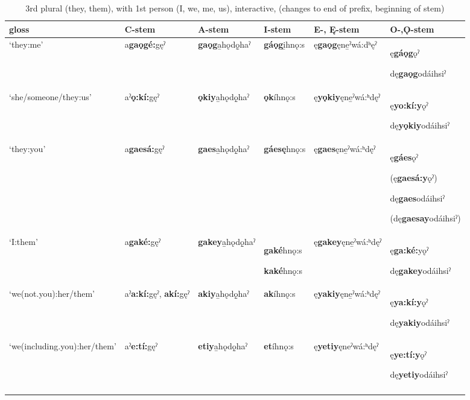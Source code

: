 \begin{table}
\caption{3rd plural (they, them), with 1st person (I, we, me, us), interactive, (changes to end of prefix, beginning of stem)}
\label{tab:1:3mpl1pronb}
\tiny{
\begin{tabularx}{\textwidth}{XXXXXX}
\lsptoprule
gloss & C-stem & A-stem & I-stem & E-, Ę{}-stem & O-,Ǫ{}-stem\\
\midrule
‘they:me’ & a\textbf{gaǫgé:}gęˀ & \textbf{gaǫg}a̱hǫdǫ̱haˀ & \textbf{gáǫg}i̱hnǫ:s & ę\textbf{gaǫg}ęne̱ˀwá:dʰęˀ & ę\textbf{gáǫg}ǫˀ

dę\textbf{gaǫg}odáihsiˀ\\
‘she/someone/they:us’ & aˀ\textbf{ǫ:kí:}gęˀ & \textbf{ǫkiy}a̱hǫdǫ̱haˀ & \textbf{ǫk}íhnǫ:s & ę\textbf{yǫkiy}ęne̱ˀwá:ʰdęˀ & ę\textbf{yo:kí:y}ǫˀ

dę\textbf{yǫkiy}odáihsiˀ\\
‘they:you’ & a\textbf{gaesá:}gęˀ & \textbf{gaes}a̱hǫdǫ̱haˀ & \textbf{gáesę}hnǫ:s & ę\textbf{gaes}ęne̱ˀwá:ʰdęˀ & ę\textbf{gáes}ǫˀ 

(ę\textbf{gaesá:y}ǫˀ)

dę\textbf{gaes}odáihsiˀ

(dę\textbf{gaesay}odáihsiˀ)\\
‘I:them’ & a\textbf{gaké:}gęˀ & \textbf{gakey}a̱hǫdǫ̱haˀ & \textbf{gaké}hnǫ:s

\textbf{kaké}hnǫ:s & ę\textbf{gakey}ęne̱ˀwá:ʰdęˀ & ę\textbf{ga:ké:}yǫˀ

dę\textbf{gakey}odáihsiˀ\\
‘we(not.you):her/them’ & aˀ\textbf{a:kí:}gęˀ, \textbf{akí:}gęˀ & \textbf{akiy}a̱hǫdǫ̱haˀ & \textbf{ak}íhnǫ:s & ę\textbf{yakiy}ęne̱ˀwá:ʰdęˀ & ę\textbf{ya:kí:y}ǫˀ

dę\textbf{yakiy}odáihsiˀ\\
‘we(including.you):her/them’ & aˀ\textbf{e:tí:}gęˀ & \textbf{etiy}a̱hǫdǫ̱haˀ & \textbf{et}íhnǫ:s & ę\textbf{yetiy}ęneˀwá:ʰdęˀ & ę\textbf{ye:tí:y}ǫˀ

dę\textbf{yetiy}odáihsiˀ\\
\lspbottomrule
\end{tabularx}}
\end{table}



